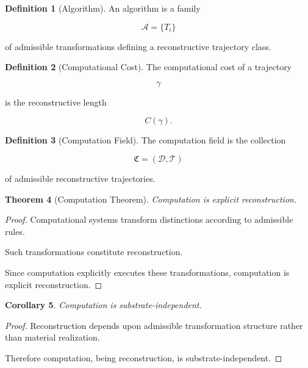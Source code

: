 \documentclass[12pt,oneside]{article}
\newtheorem{theorem}{Theorem}[section] \newtheorem{lemma}[theorem]{Lemma} \newtheorem{proposition}[theorem]{Proposition} \newtheorem{corollary}[theorem]{Corollary}
\theoremstyle{definition}
\newtheorem{definition}[theorem]{Definition} \newtheorem{axiom}[theorem]{Axiom} \newtheorem{remark}[theorem]{Remark} \newtheorem{example}[theorem]{Example}
\begin{document}
\begin{definition}[Algorithm]

An algorithm is a family

\[
\mathcal A
=
\{T_i\}
\]

of admissible transformations defining a reconstructive trajectory class.

\end{definition}

\begin{definition}[Computational Cost]

The computational cost of a trajectory

\[
\gamma
\]

is the reconstructive length

\[
C(\gamma).
\]

\end{definition}

\begin{definition}[Computation Field]

The computation field is the collection

\[
\mathfrak C
=
(\mathcal D,\mathcal T)
\]

of admissible reconstructive trajectories.

\end{definition}

\begin{theorem}[Computation Theorem]

Computation is explicit reconstruction.

\end{theorem}

\begin{proof}

Computational systems transform distinctions according to admissible rules.

Such transformations constitute reconstruction.

Since computation explicitly executes these transformations, computation is explicit reconstruction.

\end{proof}

\begin{corollary}

Computation is substrate-independent.

\end{corollary}

\begin{proof}

Reconstruction depends upon admissible transformation structure rather than material realization.

Therefore computation, being reconstruction, is substrate-independent.

\end{proof}
\end{document}
